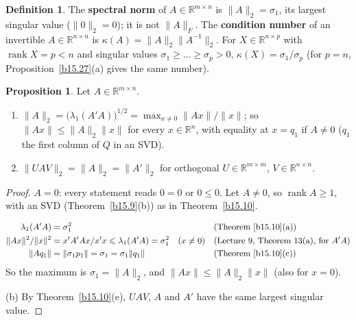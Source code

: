 \documentclass[12pt]{article}
\newcommand{\R}{\mathbb R}
\DeclareMathOperator{\rank}{rank}
\theoremstyle{definition}
\newtheorem{proposition}[theorem]{Proposition}
\newtheorem{definition}[theorem]{Definition}
\newcommand{\lec}[1]{Lecture~#1}
\newcommand{\boardtop}{\vspace*{-\abovedisplayskip}}
\begin{document}
\begin{definition}\label{b15.14}\label{b15.26}
The \textbf{spectral norm} of \(A\in\R^{m\times n}\) is \(\lVert A\rVert_2=\sigma_1\), its largest singular value
(\(\lVert0\rVert_2=0\)); it is not \(\lVert A\rVert_F\). The \textbf{condition number} of an invertible
\(A\in\R^{n\times n}\) is \(\kappa(A)=\lVert A\rVert_2\lVert A^{-1}\rVert_2\). For \(X\in\R^{n\times p}\) with
\(\rank X=p<n\) and singular values \(\sigma_1\geqslant\dots\geqslant\sigma_p>0\), \(\kappa(X)=\sigma_1/\sigma_p\) (for
\(p=n\), Proposition~\ref{b15.27}(a) gives the same number).
\end{definition}

\begin{proposition}\label{b15.15}
Let \(A\in\R^{m\times n}\).
\begin{enumerate}
\item \(\lVert A\rVert_2=\bigl(\lambda_1(A'A)\bigr)^{1/2}=\max_{x\ne0}\lVert Ax\rVert/\lVert x\rVert\); so
\(\lVert Ax\rVert\leqslant\lVert A\rVert_2\lVert x\rVert\) for every \(x\in\R^n\), with equality at \(x=q_1\) if
\(A\ne0\) (\(q_1\) the first column of \(Q\) in an SVD).
\item \(\lVert UAV\rVert_2=\lVert A\rVert_2=\lVert A'\rVert_2\) for orthogonal \(U\in\R^{m\times m}\),
\(V\in\R^{n\times n}\).
\end{enumerate}
\end{proposition}
\begin{proof}
\(A=0\): every statement reads \(0=0\) or \(0\leqslant0\). Let \(A\ne0\), so \(\rank A\geqslant1\), with an SVD
(Theorem~\ref{b15.9}(b)) as in Theorem~\ref{b15.10}.
\begin{board}[(a)]
\boardtop
\begin{align*}
\lambda_1(A'A)&=\sigma_1^2&&\text{(Theorem~\ref{b15.10}(a))}\\
\lVert Ax\rVert^2/\lVert x\rVert^2&=x'A'Ax/x'x\leqslant\lambda_1(A'A)=\sigma_1^2\quad(x\ne0)&&\text{(\lec{9}, Theorem~13(a), for \(A'A\))}\\
\lVert Aq_1\rVert&=\lVert\sigma_1p_1\rVert=\sigma_1=\sigma_1\lVert q_1\rVert&&\text{(Theorem~\ref{b15.10}(c))}
\end{align*}
So the maximum is \(\sigma_1=\lVert A\rVert_2\), and \(\lVert Ax\rVert\leqslant\lVert A\rVert_2\lVert x\rVert\) (also for
\(x=0\)).
\end{board}
(b) By Theorem~\ref{b15.10}(e), \(UAV\), \(A\) and \(A'\) have the same largest singular value.
\end{proof}
\end{document}
